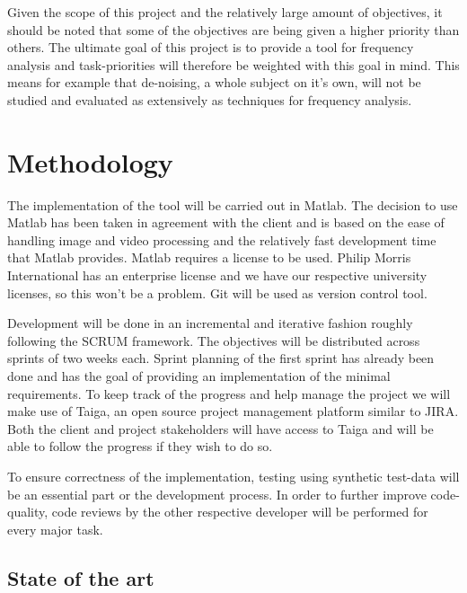 \documentclass[11pt]{scrartcl}
\begin{document}
Given the scope of this project and the relatively large amount of objectives, it should be noted that some of
the objectives are being given a higher priority than others. The ultimate goal of this project is to provide
a tool for frequency analysis and task-priorities will therefore be weighted with this goal in mind. This
means for example that de-noising, a whole subject on it’s own, will not be studied and evaluated as
extensively as techniques for frequency analysis.

 

\section{Methodology}

The implementation of the tool will be carried out in Matlab. The decision to use Matlab has been taken in
agreement with the client and is based on the ease of handling image and video processing and the relatively
fast development time that Matlab provides.  Matlab requires a license to be used. Philip Morris International
has an enterprise license and we have our respective university licenses, so this won’t be a problem. Git will
be used as version control tool.

Development will be done in an incremental and iterative fashion roughly following the SCRUM framework. The
objectives will be distributed across sprints of two weeks each. Sprint planning of the first sprint has
already been done and has the goal of providing an implementation of the minimal requirements. To keep track
of the progress and help manage the project we will make use of Taiga, an open source project management
platform similar to JIRA. Both the client and project stakeholders will have access to Taiga and will be able
to follow the progress if they wish to do so.

To ensure correctness of the implementation, testing using synthetic test-data will be an essential part or
the development process. In order to further improve code-quality, code reviews by the other respective
developer will be performed for every major task.

\subsection{State of the art}
\end{document}
